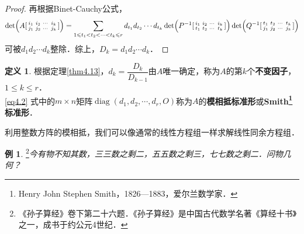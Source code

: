 \documentclass[a4paper,fontset=windows]{ctexbook}
\theoremstyle{definition}
\newtheorem{definition}{定义}[chapter]
\newtheorem{example}{例}[chapter]
\DeclareMathOperator{\diag}{diag}
\renewcommand{\le}{\leqslant}
\begin{document}
\begin{proof}
再根据Binet-Cauchy公式，
$$\det\Bigl(A[\begin{smallmatrix}i_1&i_2&\cdots&i_k \\ j_1&j_2&\cdots&j_k\end{smallmatrix}]\Bigr)=\sum_{1\le t_1<t_2<\cdots<t_k\le r}d_{t_1}d_{t_2}\cdots d_{t_k}\det\Bigl(P^{-1}[\begin{smallmatrix}i_1&i_2&\cdots&i_k \\ t_1&t_2&\cdots&t_k\end{smallmatrix}]\Bigr)\det\Bigl(Q^{-1}[\begin{smallmatrix}t_1&t_2&\cdots&t_k \\ j_1&j_2&\cdots&j_k\end{smallmatrix}]\Bigr)$$
可被$d_1d_2\cdots d_k$整除．综上，$D_k=d_1d_2\cdots d_k$．
\end{proof}

\begin{definition}
根据定理\ref{thm4.13}，$d_k=\dfrac{D_k}{D_{k-1}}$由$A$唯一确定，称为$A$的第$k$个{\bf 不变因子}，$1\le k\le r$．\\
\eqref{eq4.2} 式中的$m\times n$矩阵$\diag(d_1,d_2,\cdots,d_r,O)$称为$A$的{\bf 模相抵标准形}或{\bf Smith\footnote{Henry John Stephen Smith，1826—1883，爱尔兰数学家．}标准形}．
\end{definition}

利用整数方阵的模相抵，我们可以像通常的线性方程组一样求解线性同余方程组．

\begin{example}
\footnote{《孙子算经》卷下第二十六题．《孙子算经》是中国古代数学名著《算经十书》之一，成书于约公元4世纪．}\em 今有物不知其数，三三数之剩二，五五数之剩三，七七数之剩二．问物几何？
\end{example}
\end{document}

